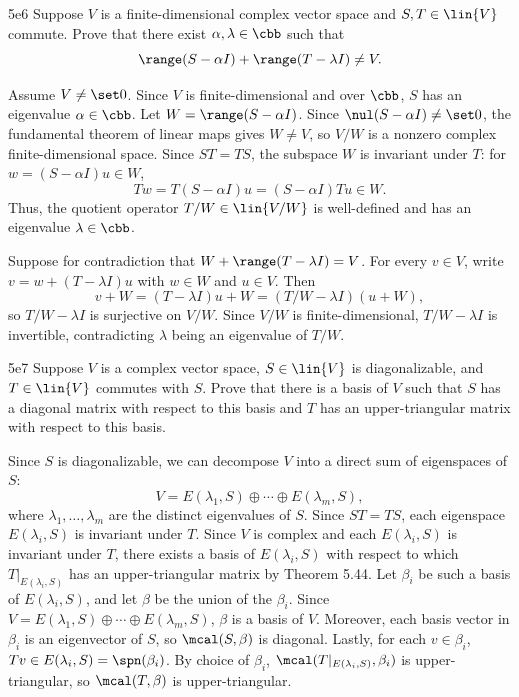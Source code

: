 \begin{exercise}{5e6}
    Suppose $V$ is a finite-dimensional complex vector space and $S, T \in \lin{V}$ commute.
    Prove that there exist $\alpha, \lambda \in \cbb$ such that
    \[
        \range(S - \alpha I) + \range(T - \lambda I) \neq V.
    \]
\end{exercise}

\begin{sol}
    Assume $V \neq \set 0$.
    Since $V$ is finite-dimensional and over $\cbb$, $S$ has an eigenvalue $\alpha \in \cbb$.
    Let $W = \range(S - \alpha I)$.
    Since $\nul(S - \alpha I) \neq \set 0$, the fundamental theorem of linear maps gives $W \neq V$, so $V/W$ is a nonzero complex finite-dimensional space.
    Since $ST = TS$, the subspace $W$ is invariant under $T$: for $w = (S - \alpha I)u \in W$,
    \[
        Tw = T(S - \alpha I)u = (S - \alpha I)Tu \in W.
    \]
    Thus, the quotient operator $T/W \in \lin{V/W}$ is well-defined and has an eigenvalue $\lambda \in \cbb$.

    Suppose for contradiction that $W + \range(T - \lambda I) = V$.
    For every $v \in V$, write $v = w + (T - \lambda I)u$ with $w \in W$ and $u \in V$.
    Then
    \[
        v + W = (T - \lambda I)u + W = (T/W - \lambda I)(u + W),
    \]
    so $T/W - \lambda I$ is surjective on $V/W$.
    Since $V/W$ is finite-dimensional, $T/W - \lambda I$ is invertible, contradicting $\lambda$ being an eigenvalue of $T/W$.
\end{sol}

\begin{exercise}{5e7}
    Suppose $V$ is a complex vector space, $S \in \lin{V}$ is diagonalizable, and $T \in \lin{V}$ commutes with $S$.
    Prove that there is a basis of $V$ such that $S$ has a diagonal matrix with respect to this basis and $T$ has an upper-triangular matrix with respect to this basis.
\end{exercise}

\begin{sol}
    Since $S$ is diagonalizable, we can decompose $V$ into a direct sum of eigenspaces of $S$:
    \[
        V = E(\lambda_1, S) \oplus \cdots \oplus E(\lambda_m, S),
    \]
    where $\lambda_1, \ldots, \lambda_m$ are the distinct eigenvalues of $S$.
    Since $ST = TS$, each eigenspace $E(\lambda_i, S)$ is invariant under $T$.
    Since $V$ is complex and each $E(\lambda_i, S)$ is invariant under $T$, there exists a basis of $E(\lambda_i, S)$ with respect to which $T|_{E(\lambda_i, S)}$ has an upper-triangular matrix by Theorem 5.44.
    Let $\beta_i$ be such a basis of $E(\lambda_i, S)$, and let $\beta$ be the union of the $\beta_i$.
    Since $V = E(\lambda_1, S) \oplus \cdots \oplus E(\lambda_m, S)$, $\beta$ is a basis of $V$.
    Moreover, each basis vector in $\beta_i$ is an eigenvector of $S$, so $\mcal(S, \beta)$ is diagonal.
    Lastly, for each $v \in \beta_i$, $Tv \in E(\lambda_i, S) = \spn(\beta_i)$.
    By choice of $\beta_i$, $\mcal(T|_{E(\lambda_i, S)}, \beta_i)$ is upper-triangular, so $\mcal(T, \beta)$ is upper-triangular.
\end{sol}

